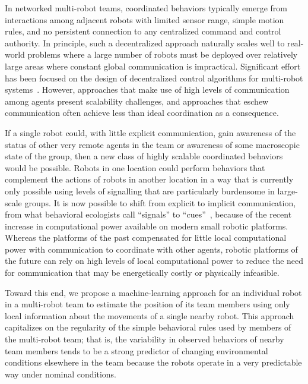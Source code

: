 \documentclass[letterpaper, 10 pt, conference]{ieeeconf}  %
\begin{document}
	
	In networked multi-robot teams, coordinated behaviors typically emerge
	from interactions among adjacent robots with limited sensor range,
	simple motion rules, and no persistent connection to any centralized
	command and control authority. In principle, such a decentralized
	approach naturally scales well to real-world problems where a large
	number of robots must be deployed over relatively large areas where
	constant global communication is impractical. Significant effort has
	been focused on the design of decentralized control algorithms for
	multi-robot systems~\cite{%
		WK02, %
		CM04, %
		OA10, %
		NK11, %
		BFBD13, %
		RCN14, %
		WPKBPB14, %
		DGRSST14, %
		YDJH15, %
		VHD15, %
		VH15, %
		EB16, %
		VFHD16%
	}. However,
	approaches that make use of high levels of communication among agents
	present scalability challenges, and approaches that eschew communication
	often achieve less than ideal coordination as a consequence.
	
	If a single robot could, with little explicit communication, gain
	awareness of the status of other very remote agents in the team or
	awareness of some macroscopic state of the group, then a new class of
	highly scalable coordinated behaviors would be possible. Robots in one
	location could perform behaviors that complement the actions of robots
	in another location in a way that is currently only possible using
	levels of signalling that are particularly burdensome in large-scale
	groups. It is now possible to shift from explicit to implicit
	communication, from what behavioral ecologists call ``signals'' to
	``cues''~\cite{BV11}, because of the recent increase in computational
	power available on modern small robotic platforms. Whereas the platforms
	of the past compensated for little local computational power with
	communication to coordinate with other agents, robotic platforms of the
	future can rely on high levels of local computational power to reduce
	the need for communication that may be energetically costly or
	physically infeasible.
	
	Toward this end, we propose a machine-learning approach for an
	individual robot in a multi-robot team to estimate the position of its
	team members using only local information about the movements of a
	single nearby robot. This approach capitalizes on the regularity of the
	simple behavioral rules used by members of the multi-robot team; that
	is, the variability in observed behaviors of nearby team members tends
	to be a strong predictor of changing environmental conditions elsewhere
	in the team because the robots operate in a very predictable way under
	nominal conditions.
	
\end{document}
